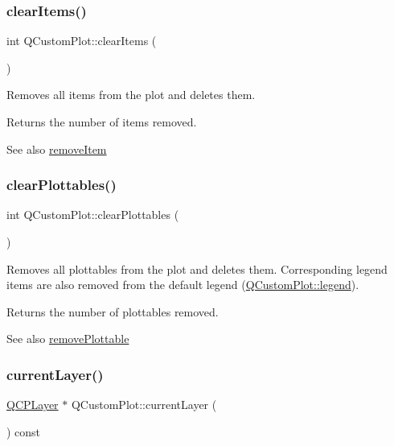 \subsubsection{\texorpdfstring{clear\+Items()}{clearItems()}}
{\footnotesize\ttfamily int Q\+Custom\+Plot\+::clear\+Items (\begin{DoxyParamCaption}{ }\end{DoxyParamCaption})}

Removes all items from the plot and deletes them.

Returns the number of items removed.

\begin{DoxySeeAlso}{See also}
\hyperlink{class_q_custom_plot_ae04446557292551e8fb6e2c106e1848d}{remove\+Item} 
\end{DoxySeeAlso}
\mbox{\label{class_q_custom_plot_a9a409bb3201878adb7ffba1c89c4e004}} 
\subsubsection{\texorpdfstring{clear\+Plottables()}{clearPlottables()}}
{\footnotesize\ttfamily int Q\+Custom\+Plot\+::clear\+Plottables (\begin{DoxyParamCaption}{ }\end{DoxyParamCaption})}

Removes all plottables from the plot and deletes them. Corresponding legend items are also removed from the default legend (\hyperlink{class_q_custom_plot_a4eadcd237dc6a09938b68b16877fa6af}{Q\+Custom\+Plot\+::legend}).

Returns the number of plottables removed.

\begin{DoxySeeAlso}{See also}
\hyperlink{class_q_custom_plot_af3dafd56884208474f311d6226513ab2}{remove\+Plottable} 
\end{DoxySeeAlso}
\mbox{\label{class_q_custom_plot_a0421d647f420b0b4c57aec1708857af5}} 
\subsubsection{\texorpdfstring{current\+Layer()}{currentLayer()}}
{\footnotesize\ttfamily \hyperlink{class_q_c_p_layer}{Q\+C\+P\+Layer} $\ast$ Q\+Custom\+Plot\+::current\+Layer (\begin{DoxyParamCaption}{ }\end{DoxyParamCaption}) const}

